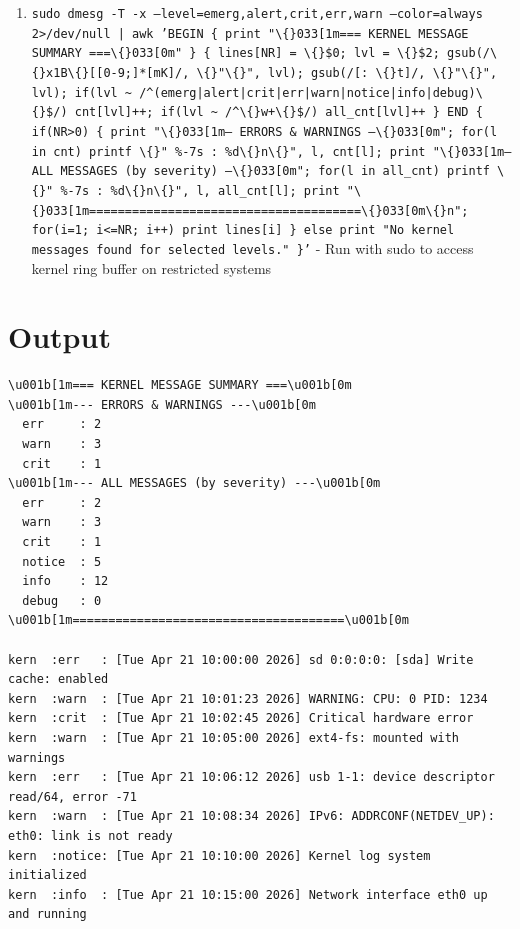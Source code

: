 \documentclass{article}
\begin{document}
\begin{enumerate}
  \item \texttt{sudo dmesg -T -x --level=emerg,alert,crit,err,warn --color=always 2>/dev/null | awk 'BEGIN \{ print "\textbackslash\{\}033[1m=== KERNEL MESSAGE SUMMARY ===\textbackslash\{\}033[0m" \} \{ lines[NR] = \textbackslash\{\}\$0; lvl = \textbackslash\{\}\$2; gsub(/\textbackslash\{\}x1B\textbackslash\{\}[[0-9;]*[mK]/, \textbackslash\{\}"\textbackslash\{\}", lvl); gsub(/[: \textbackslash\{\}t]/, \textbackslash\{\}"\textbackslash\{\}", lvl); if(lvl \textasciitilde{} /\textasciicircum{}(emerg|alert|crit|err|warn|notice|info|debug)\textbackslash\{\}\$/) cnt[lvl]++; if(lvl \textasciitilde{} /\textasciicircum{}\textbackslash\{\}w+\textbackslash\{\}\$/) all\_cnt[lvl]++ \} END \{ if(NR>0) \{ print "\textbackslash\{\}033[1m--- ERRORS \& WARNINGS ---\textbackslash\{\}033[0m"; for(l in cnt) printf \textbackslash\{\}"  \%-7s : \%d\textbackslash\{\}n\textbackslash\{\}", l, cnt[l]; print "\textbackslash\{\}033[1m--- ALL MESSAGES (by severity) ---\textbackslash\{\}033[0m"; for(l in all\_cnt) printf \textbackslash\{\}"  \%-7s : \%d\textbackslash\{\}n\textbackslash\{\}", l, all\_cnt[l]; print "\textbackslash\{\}033[1m======================================\textbackslash\{\}033[0m\textbackslash\{\}n"; for(i=1; i<=NR; i++) print lines[i] \} else print "No kernel messages found for selected levels." \}'} - Run with sudo to access kernel ring buffer on restricted systems
\end{enumerate}

\section*{Output}
\begin{lstlisting}
\u001b[1m=== KERNEL MESSAGE SUMMARY ===\u001b[0m
\u001b[1m--- ERRORS & WARNINGS ---\u001b[0m
  err     : 2
  warn    : 3
  crit    : 1
\u001b[1m--- ALL MESSAGES (by severity) ---\u001b[0m
  err     : 2
  warn    : 3
  crit    : 1
  notice  : 5
  info    : 12
  debug   : 0
\u001b[1m======================================\u001b[0m

kern  :err   : [Tue Apr 21 10:00:00 2026] sd 0:0:0:0: [sda] Write cache: enabled
kern  :warn  : [Tue Apr 21 10:01:23 2026] WARNING: CPU: 0 PID: 1234
kern  :crit  : [Tue Apr 21 10:02:45 2026] Critical hardware error
kern  :warn  : [Tue Apr 21 10:05:00 2026] ext4-fs: mounted with warnings
kern  :err   : [Tue Apr 21 10:06:12 2026] usb 1-1: device descriptor read/64, error -71
kern  :warn  : [Tue Apr 21 10:08:34 2026] IPv6: ADDRCONF(NETDEV_UP): eth0: link is not ready
kern  :notice: [Tue Apr 21 10:10:00 2026] Kernel log system initialized
kern  :info  : [Tue Apr 21 10:15:00 2026] Network interface eth0 up and running
\end{lstlisting}
\end{document}
